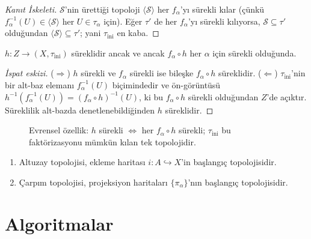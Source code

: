 \begin{proof}[Kanıt İskeleti]
$\mathcal{S}$'nin ürettiği topoloji $\langle\mathcal{S}\rangle$ her $f_\alpha$'yı
sürekli kılar (çünkü $f_\alpha^{-1}(U) \in \langle\mathcal{S}\rangle$ her $U \in \tau_\alpha$
için). Eğer $\tau'$ de her $f_\alpha$'yı sürekli kılıyorsa, $\mathcal{S} \subseteq \tau'$
olduğundan $\langle\mathcal{S}\rangle \subseteq \tau'$; yani $\tau_{\mathrm{ini}}$ en kaba.
\end{proof}

\begin{theorem}
\label{thm:initial_universal}
$h: Z \to (X, \tau_{\mathrm{ini}})$ süreklidir ancak ve ancak $f_\alpha \circ h$ her
$\alpha$ için sürekli olduğunda.
\end{theorem}

\begin{proof}[İspat eskizi]
($\Rightarrow$) $h$ sürekli ve $f_\alpha$ sürekli ise bileşke $f_\alpha \circ h$
süreklidir. ($\Leftarrow$) $\tau_{\mathrm{ini}}$'nin bir alt-baz elemanı
$f_\alpha^{-1}(U)$ biçimindedir ve ön-görüntüsü
$h^{-1}(f_\alpha^{-1}(U)) = (f_\alpha \circ h)^{-1}(U)$, ki bu $f_\alpha \circ h$
sürekli olduğundan $Z$'de açıktır. Süreklilik alt-bazda denetlenebildiğinden $h$
süreklidir.
\end{proof}

\begin{figure}[ht]
\centering

\caption{Evrensel özellik: $h$ sürekli $\iff$ her $f_\alpha\circ h$ sürekli;
$\tau_{\mathrm{ini}}$ bu faktörizasyonu mümkün kılan tek topolojidir.}
\label{fig:ch13_evrensel}
\end{figure}

\begin{theorem}
\label{thm:initial_special}
\begin{enumerate}
  \item Altuzay topolojisi, ekleme haritası $i: A \hookrightarrow X$'in başlangıç
        topolojisidir.
  \item Çarpım topolojisi, projeksiyon haritaları $\{\pi_\alpha\}$'nın başlangıç
        topolojisidir.
\end{enumerate}
\end{theorem}

\section{Algoritmalar}
\label{sec:initial_algorithms}

